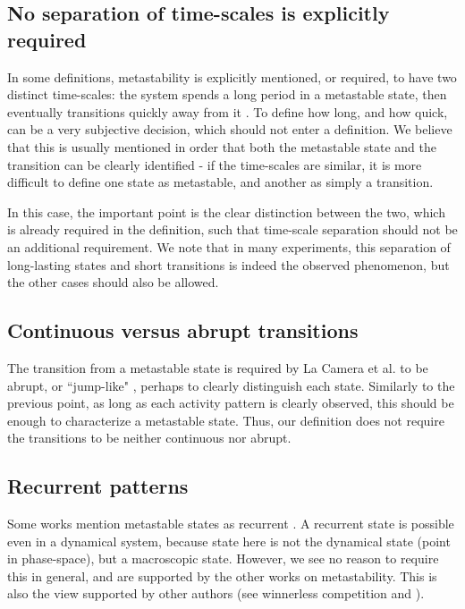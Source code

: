 \documentclass[preprint,superscriptaddress,showpacs,amsmath,amssymb,aps,pre,floatfix]{revtex4-1}
\theoremstyle{definition}
\begin{document}
\subsection{No separation of time-scales is explicitly required}
\label{sec:metastability-time-scales}

In some definitions, metastability is explicitly mentioned, or required, to have two distinct time-scales: the system  spends a long period in a metastable state, then eventually transitions quickly away from it \cite{hudson_2017}. To define how long, and how quick, can be a very subjective decision, which should not enter a definition.
We believe that this is usually mentioned in order that both the metastable state and the transition can be clearly identified - if the time-scales are similar, it is more difficult to define one state as metastable, and another as simply a transition.

In this case, the important point is the clear distinction between the two, which is already required in the definition, such that time-scale separation should not be an additional requirement. We note that in many experiments, this separation of long-lasting states and short transitions is indeed the observed phenomenon, but the other cases should also be allowed.

\subsection{Continuous versus abrupt transitions}
The transition from a metastable state is required by La Camera et al. to be abrupt, or ``jump-like" \cite{lacamera_2019}, perhaps to clearly distinguish each state. Similarly to the previous point, as long as each activity pattern is clearly observed, this should be enough to characterize a metastable state. Thus, our definition does not require the transitions to be neither continuous nor abrupt. 


\subsection{Recurrent patterns}
Some works mention metastable states as recurrent \cite{beimgraben_2019, varela_2001}. A recurrent state is possible even in a dynamical system, because state here is not the dynamical state (point in phase-space), but a macroscopic state. However, we see no reason to require this in general, and are supported by the other works on metastability. This is also the view supported by other authors (see winnerless competition and \cite{roberts_2019}).
\end{document}
